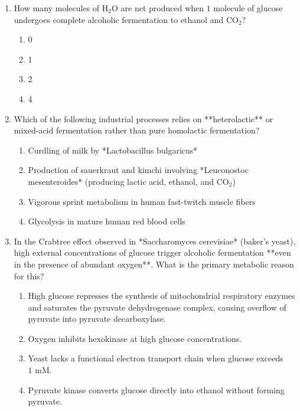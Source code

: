 \documentclass[11pt, a4paper]{article}
\begin{document}
\begin{enumerate}[label=\textbf{\arabic*.}]
\item How many molecules of $\text{H}_2\text{O}$ are net produced when $1\text{ molecule}$ of glucose undergoes complete alcoholic fermentation to ethanol and $\text{CO}_2$?
\begin{enumerate}[label=(\Alph*)]
    \item 0
    \item 1
    \item 2
    \item 4
\end{enumerate}

\item Which of the following industrial processes relies on **heterolactic** or mixed-acid fermentation rather than pure homolactic fermentation?
\begin{enumerate}[label=(\Alph*)]
    \item Curdling of milk by *Lactobacillus bulgaricus*
    \item Production of sauerkraut and kimchi involving *Leuconostoc mesenteroides* (producing lactic acid, ethanol, and $\text{CO}_2$)
    \item Vigorous sprint metabolism in human fast-twitch muscle fibers
    \item Glycolysis in mature human red blood cells
\end{enumerate}

\item In the Crabtree effect observed in *Saccharomyces cerevisiae* (baker's yeast), high external concentrations of glucose trigger alcoholic fermentation **even in the presence of abundant oxygen**. What is the primary metabolic reason for this?
\begin{enumerate}[label=(\Alph*)]
    \item High glucose represses the synthesis of mitochondrial respiratory enzymes and saturates the pyruvate dehydrogenase complex, causing overflow of pyruvate into pyruvate decarboxylase.
    \item Oxygen inhibits hexokinase at high glucose concentrations.
    \item Yeast lacks a functional electron transport chain when glucose exceeds $1\text{ mM}$.
    \item Pyruvate kinase converts glucose directly into ethanol without forming pyruvate.
\end{enumerate}


\end{enumerate}
\end{document}
